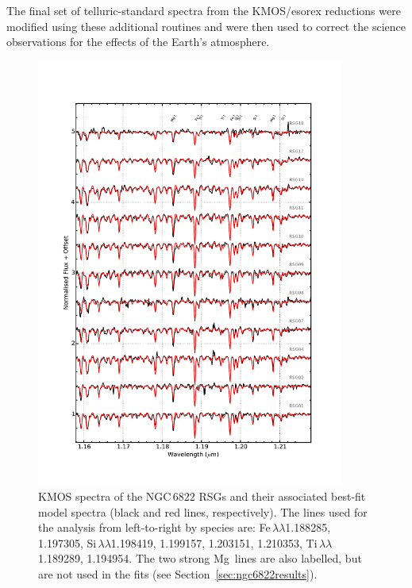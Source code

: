 The final set of telluric-standard spectra from the KMOS/esorex reductions were modified using these additional routines and were then used to correct the science observations for the effects of the Earth's atmosphere.



\begin{figure}
 \centering
 \begin{center}
\includegraphics[width=0.9\textwidth]{ngc6822/N6822_mod_fit}
\caption[Observed and best-fit model spectra]{
KMOS spectra of the NGC\,6822 RSGs and their associated best-fit model spectra
(black and red lines, respectively).
The lines used for the analysis from left-to-right by species are:
Fe\,\1$\lambda\lambda$1.188285,
1.197305,
Si\,\1$\lambda\lambda$1.198419,
1.199157,
1.203151,
1.210353,
Ti\,\1$\lambda\lambda$1.189289,
1.194954.
The two strong Mg\,\1 lines are also labelled, but are not used in the fits
(see Section~\ref{sec:ngc6822results}).
         }
\label{fig:model_fits}
\end{center}
\end{figure}


